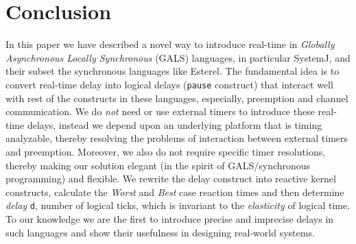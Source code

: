 \section{Conclusion}
\label{sec:concl-future-work}

In this paper we have described a novel way to introduce real-time in
\textit{Globally Asynchronous Locally Synchronous} (GALS) languages, in
particular SystemJ, and their subset the synchronous languages like
Esterel. The fundamental idea is to convert real-time delay into logical
delays (\texttt{pause} construct) that interact well with rest of the
constructs in these languages, especially, preemption and channel
communication. We do \textit{not} need or use external timers to
introduce these real-time delays, instead we depend upon an underlying
platform that is timing analyzable, thereby resolving the problems of
interaction between external timers and preemption. Moreover, we also do
not require specific timer resolutions, thereby making our solution
elegant (in the spirit of GALS/synchronous programming) and flexible. We
rewrite the delay construct into reactive kernel constructs, calculate
the \textit{Worst} and \textit{Best} case reaction times and then
determine \textit{delay} \texttt{d}, number of logical ticks, which is
invariant to the \textit{elasticity} of logical time. To our knowledge
we are the first to introduce precise and imprecise delays in such
languages and show their usefulness in designing real-world systems.


